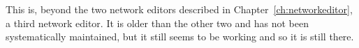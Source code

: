 

This is, beyond the two network editors described in Chapter~\ref{ch:networkeditor}, a third network editor. 
It is older than the other two and has not been systematically maintained, but it still seems to be working and so it is still there.


